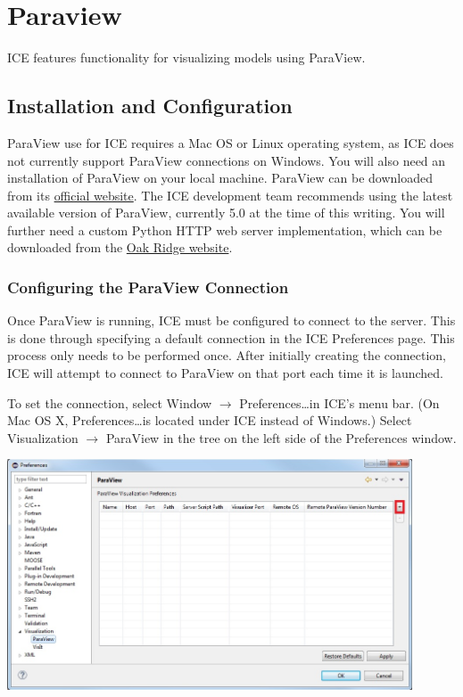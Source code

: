 \chapter{Paraview}

ICE features functionality for visualizing models using ParaView.

\section{Installation and Configuration}

ParaView use for ICE requires a Mac OS or Linux operating system, as ICE does
not currently support ParaView connections on Windows. You will also need an
installation of ParaView on your local machine. ParaView can be downloaded from
its \href{http://www.paraview.org/download/}{official website}. The ICE
development team recommends using the latest available version of ParaView,
currently 5.0 at the time of this writing. You will further need a custom
Python HTTP web server implementation, which can be downloaded from the
\href{http://eclipseice.ornl.gov/downloads/paraview/scripts/http_pvw_server.py}{Oak
Ridge website}.

\subsection{Configuring the ParaView Connection}

Once ParaView is running, ICE must be configured to connect to the server. This
is done through specifying a default connection in the ICE Preferences page.
This process only needs to be performed once. After initially creating the
connection, ICE will attempt to connect to ParaView on that port each time it is
launched.

To set the connection, select Window $\rightarrow$ Preferences\ldots in ICE's
menu bar. (On Mac OS X, Preferences\ldots is located under ICE instead of
Windows.) Select Visualization $\rightarrow$ ParaView in the tree on the left
side of the Preferences window.

\begin{center}
\includegraphics[width=12cm]{images/paraviewpreferencepage_ice}
\end{center}

